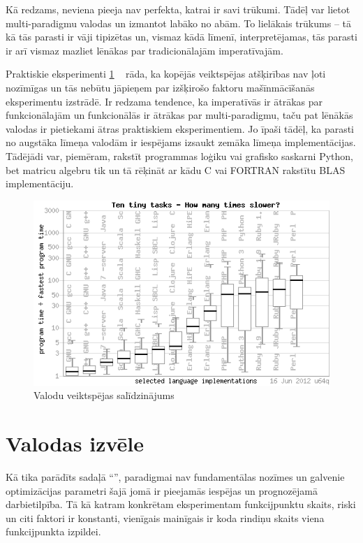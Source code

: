 \documentclass{ludis}
\begin{document}
Kā redzams, neviena pieeja nav perfekta, katrai ir savi trūkumi. Tādēļ var lietot multi-paradigmu valodas un izmantot labāko no abām. To lielākais trūkums -- tā kā tās parasti ir vāji tipizētas un, vismaz kādā līmenī, interpretējamas, tās parasti ir arī vismaz mazliet lēnākas par tradicionālajām imperatīvajām. 

Praktiskie eksperimenti \ref{fig:bench_game} ~\cite{bench_game} rāda, ka kopējās veiktspējas atšķirības nav ļoti nozīmīgas un tās nebūtu jāpieņem par izšķirošo faktoru mašīnmācīšanās eksperimentu izstrādē. Ir redzama tendence, ka imperatīvās ir ātrākas par funkcionālajām un funkcionālās ir ātrākas par multi-paradigmu, taču pat lēnākās valodas ir pietiekami ātras praktiskiem eksperimentiem. Jo īpaši tādēļ, ka parasti no augstāka līmeņa valodām ir iespējams izsaukt zemāka līmeņa implementācijas. Tādējādi var, piemēram, rakstīt programmas loģiku vai grafisko saskarni Python, bet matricu algebru tik un tā rēķināt ar kādu C vai FORTRAN rakstītu BLAS implementāciju.
\begin{figure}
  \centering
  \includegraphics{img/bench_game}
  \caption{Valodu veiktspējas salīdzinājums}
  \label{fig:bench_game}
\end{figure}

\section{Valodas izvēle}
Kā tika parādīts sadaļā ``'', paradigmai nav fundamentālas nozīmes un galvenie optimizācijas parametri šajā jomā ir pieejamās iespējas un prognozējamā darbietilpība. Tā kā katram konkrētam eksperimentam funkcijpunktu skaits, riski un citi faktori ir konstanti, vienīgais mainīgais ir koda rindiņu skaits viena funkcijpunkta izpildei.
\end{document}
